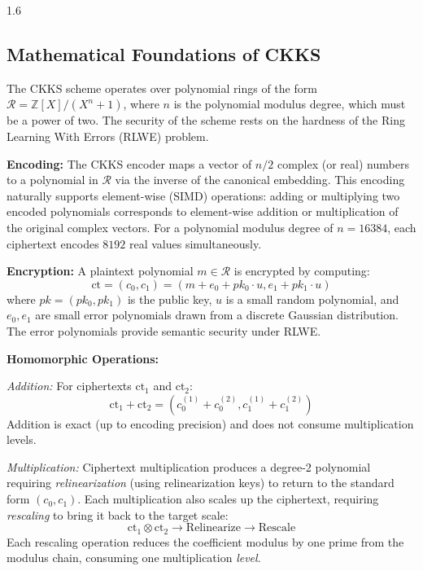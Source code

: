 \begin{spacing}{1.6}
\subsection{Mathematical Foundations of CKKS}

The CKKS scheme \cite{ckks} operates over polynomial rings of the form
$\mathcal{R} = \mathbb{Z}[X]/(X^n + 1)$, where $n$ is the polynomial modulus
degree, which must be a power of two. The security of the scheme rests on the
hardness of the Ring Learning With Errors (RLWE) problem.

\textbf{Encoding:} The CKKS encoder maps a vector of $n/2$ complex (or real)
numbers to a polynomial in $\mathcal{R}$ via the inverse of the canonical
embedding. This encoding naturally supports element-wise (SIMD) operations:
adding or multiplying two encoded polynomials corresponds to element-wise
addition or multiplication of the original complex vectors. For a polynomial
modulus degree of $n = 16384$, each ciphertext encodes $8192$ real values
simultaneously.

\textbf{Encryption:} A plaintext polynomial $m \in \mathcal{R}$ is encrypted
by computing:
\begin{equation}
  \mathrm{ct} = (c_0, c_1) = (m + e_0 + pk_0 \cdot u, e_1 + pk_1 \cdot u)
\end{equation}
where $pk = (pk_0, pk_1)$ is the public key, $u$ is a small random polynomial,
and $e_0, e_1$ are small error polynomials drawn from a discrete Gaussian
distribution. The error polynomials provide semantic security under RLWE.

\textbf{Homomorphic Operations:}

\textit{Addition:} For ciphertexts $\mathrm{ct}_1$ and $\mathrm{ct}_2$:
\begin{equation}
  \mathrm{ct}_1 + \mathrm{ct}_2 = (c_0^{(1)} + c_0^{(2)}, c_1^{(1)} + c_1^{(2)})
\end{equation}
Addition is exact (up to encoding precision) and does not consume multiplication
levels.

\textit{Multiplication:} Ciphertext multiplication produces a degree-2
polynomial requiring \textit{relinearization} (using relinearization keys) to
return to the standard form $(c_0, c_1)$. Each multiplication also scales up
the ciphertext, requiring \textit{rescaling} to bring it back to the target
scale:
\begin{equation}
  \mathrm{ct}_1 \otimes \mathrm{ct}_2 \rightarrow
  \mathrm{Relinearize} \rightarrow \mathrm{Rescale}
\end{equation}
Each rescaling operation reduces the coefficient modulus by one prime from the
modulus chain, consuming one multiplication \textit{level}.


\end{spacing}
